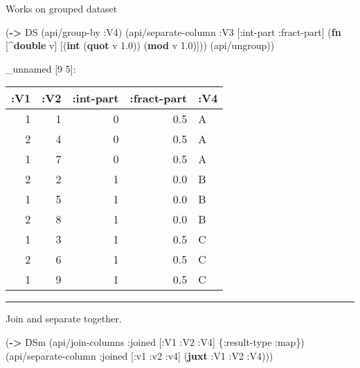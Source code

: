 \documentclass[]{article}
\newenvironment{Shaded}{\begin{snugshade}}{\end{snugshade}}
\newcommand{\KeywordTok}[1]{\textcolor[rgb]{0.13,0.29,0.53}{\textbf{#1}}}
\newcommand{\FloatTok}[1]{\textcolor[rgb]{0.00,0.00,0.81}{#1}}
\newcommand{\AttributeTok}[1]{\textcolor[rgb]{0.77,0.63,0.00}{#1}}
\newcommand{\NormalTok}[1]{#1}
\begin{document}
Works on grouped dataset

\begin{Shaded}
\begin{Highlighting}[]
\NormalTok{(}\KeywordTok{->}\NormalTok{ DS}
\NormalTok{    (api/group-by }\AttributeTok{:V4}\NormalTok{)}
\NormalTok{    (api/separate-column }\AttributeTok{:V3}\NormalTok{ [}\AttributeTok{:int-part} \AttributeTok{:fract-part}\NormalTok{] (}\KeywordTok{fn}\NormalTok{ [^}\KeywordTok{double}\NormalTok{ v]}
\NormalTok{                                                       [(}\KeywordTok{int}\NormalTok{ (}\KeywordTok{quot}\NormalTok{ v }\FloatTok{1.0}\NormalTok{))}
\NormalTok{                                                        (}\KeywordTok{mod}\NormalTok{ v }\FloatTok{1.0}\NormalTok{)]))}
\NormalTok{    (api/ungroup))}
\end{Highlighting}
\end{Shaded}

\_unnamed {[}9 5{]}:

\begin{longtable}[]{@{}rrrrl@{}}
\toprule
:V1 & :V2 & :int-part & :fract-part & :V4\tabularnewline
\midrule
\endhead
1 & 1 & 0 & 0.5 & A\tabularnewline
2 & 4 & 0 & 0.5 & A\tabularnewline
1 & 7 & 0 & 0.5 & A\tabularnewline
2 & 2 & 1 & 0.0 & B\tabularnewline
1 & 5 & 1 & 0.0 & B\tabularnewline
2 & 8 & 1 & 0.0 & B\tabularnewline
1 & 3 & 1 & 0.5 & C\tabularnewline
2 & 6 & 1 & 0.5 & C\tabularnewline
1 & 9 & 1 & 0.5 & C\tabularnewline
\bottomrule
\end{longtable}

\begin{center}\rule{0.5\linewidth}{0.5pt}\end{center}

Join and separate together.

\begin{Shaded}
\begin{Highlighting}[]
\NormalTok{(}\KeywordTok{->}\NormalTok{ DSm}
\NormalTok{    (api/join-columns }\AttributeTok{:joined}\NormalTok{ [}\AttributeTok{:V1} \AttributeTok{:V2} \AttributeTok{:V4}\NormalTok{] \{}\AttributeTok{:result-type} \AttributeTok{:map}\NormalTok{\})}
\NormalTok{    (api/separate-column }\AttributeTok{:joined}\NormalTok{ [}\AttributeTok{:v1} \AttributeTok{:v2} \AttributeTok{:v4}\NormalTok{] (}\KeywordTok{juxt} \AttributeTok{:V1} \AttributeTok{:V2} \AttributeTok{:V4}\NormalTok{)))}
\end{Highlighting}
\end{Shaded}
\end{document}
